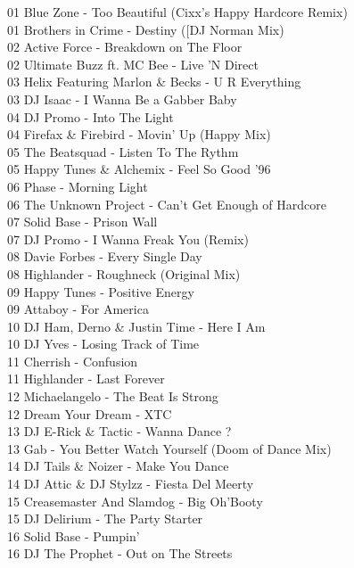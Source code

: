 \begin{multicols}{2}
 01 Blue Zone - Too Beautiful (Cixx's Happy Hardcore Remix)\\ 01 Brothers in Crime - Destiny ([DJ Norman Mix)\\ 02 Active Force - Breakdown on The Floor\\ 02 Ultimate Buzz ft. MC Bee - Live 'N Direct\\ 03 Helix Featuring Marlon \& Becks - U R Everything\\ 03 DJ Isaac - I Wanna Be a Gabber Baby\\ 04 DJ Promo - Into The Light\\ 04 Firefax \& Firebird - Movin' Up (Happy Mix)\\ 05 The Beatsquad - Listen To The Rythm\\ 05 Happy Tunes \& Alchemix - Feel So Good '96\\ 06 Phase - Morning Light\\ 06 The Unknown Project - Can't Get Enough of Hardcore\\ 07 Solid Base - Prison Wall\\ 07 DJ Promo - I Wanna Freak You (Remix)\\ 08 Davie Forbes - Every Single Day\\ 08 Highlander - Roughneck (Original Mix)\\ 09 Happy Tunes - Positive Energy\\ 09 Attaboy - For America\\ 10 DJ Ham, Derno \& Justin Time - Here I Am\\ 10 DJ Yves - Losing Track of Time\\ 11 Cherrish - Confusion\\ 11 Highlander - Last Forever\\ 12 Michaelangelo - The Beat Is Strong\\ 12 Dream Your Dream - XTC\\ 13 DJ E-Rick \& Tactic - Wanna Dance ?\\ 13 Gab - You Better Watch Yourself (Doom of Dance Mix)\\ 14 DJ Tails \& Noizer - Make You Dance\\ 14 DJ Attic \& DJ Stylzz - Fiesta Del Meerty\\ 15 Creasemaster And Slamdog - Big Oh'Booty\\ 15 DJ Delirium - The Party Starter\\ 16 Solid Base - Pumpin'\\ 16 DJ The Prophet - Out on The Streets\\
\\

\end{multicols}
